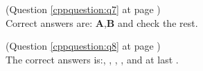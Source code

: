 \begin{cppanswer}
    \label{cppquestion:s7}
    (Question \ref{cppquestion:q7} at page \pageref{cppquestion:q7}) \hfill \\
    Correct answers are: \textbf{A},\textbf{B} and check the rest. \\       
\end{cppanswer}

\begin{cppanswer}
    \label{cppquestion:s8}
    (Question \ref{cppquestion:q8} at page \pageref{cppquestion:q8}) \hfill \\
    The correct answers is:, , , ,  and at last . \\
\end{cppanswer}
